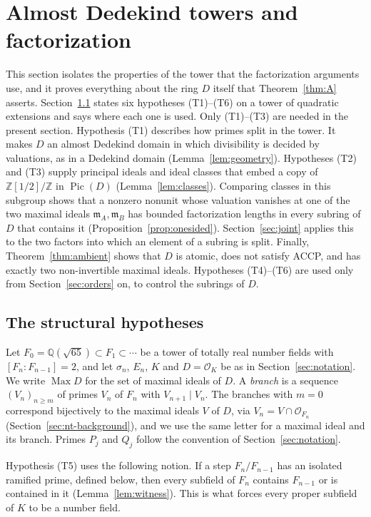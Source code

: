 \documentclass[11pt]{article}
\theoremstyle{plain}
\theoremstyle{definition}
\theoremstyle{remark}
\DeclareMathOperator{\Pic}{Pic}
\DeclareMathOperator{\Max}{Max}
\newcommand{\Z}{\mathbb Z}
\newcommand{\Q}{\mathbb Q}
\newcommand{\OO}{\mathcal O}
\newcommand{\EA}{\mathfrak m_A}
\newcommand{\EB}{\mathfrak m_B}
\begin{document}
\section{Almost Dedekind towers and factorization}\label{sec:factorization}

This section isolates the properties of the tower that the factorization
arguments use, and it proves everything about the ring $D$ itself that
Theorem~\ref{thm:A} asserts.  Section~\ref{sec:hypotheses} states six
hypotheses (T1)--(T6) on a tower of quadratic extensions and says where
each one is used.  Only (T1)--(T3) are needed in the present section.
Hypothesis (T1) describes how primes split in the tower.  It makes $D$ an
almost Dedekind domain in which divisibility is decided by valuations, as
in a Dedekind domain (Lemma~\ref{lem:geometry}).  Hypotheses (T2) and (T3)
supply principal ideals and ideal classes that embed a copy of
$\Z[1/2]/\Z$ in $\Pic(D)$ (Lemma~\ref{lem:classes}).  Comparing classes in
this subgroup shows that a nonzero nonunit whose valuation vanishes at one
of the two maximal ideals $\EA,\EB$ has bounded factorization lengths in
every subring of $D$ that contains it (Proposition~\ref{prop:onesided}).
Section~\ref{sec:joint} applies this to the two factors into which an
element of a subring is split.  Finally, Theorem~\ref{thm:ambient} shows
that $D$ is atomic, does not satisfy ACCP, and has exactly two
non-invertible maximal ideals.  Hypotheses (T4)--(T6) are used only from
Section~\ref{sec:orders} on, to control the subrings of $D$.

\subsection{The structural hypotheses}\label{sec:hypotheses}

Let $F_0=\Q(\sqrt{65})\subset F_1\subset\cdots$ be a tower of totally real
number fields with $[F_n:F_{n-1}]=2$, and let $\sigma_n$, $E_n$, $K$ and
$D=\OO_K$ be as in Section~\ref{sec:notation}.  We write $\Max D$ for the
set of maximal ideals of $D$.  A \emph{branch} is a sequence
$(V_n)_{n\geq m}$ of primes $V_n$ of $F_n$ with $V_{n+1}\mid V_n$.  The
branches with $m=0$ correspond bijectively to the maximal ideals $V$ of
$D$, via $V_n=V\cap\OO_{F_n}$ (Section~\ref{sec:nt-background}), and we
use the same letter for a maximal ideal and its branch.  Primes $P_j$ and
$Q_j$ follow the convention of Section~\ref{sec:notation}.

Hypothesis (T5) uses the following notion.  If a step $F_n/F_{n-1}$ has
an isolated ramified prime, defined below, then every subfield of $F_n$ contains $F_{n-1}$ or is
contained in it (Lemma~\ref{lem:witness}).  This is what forces every
proper subfield of $K$ to be a number field.
\end{document}
